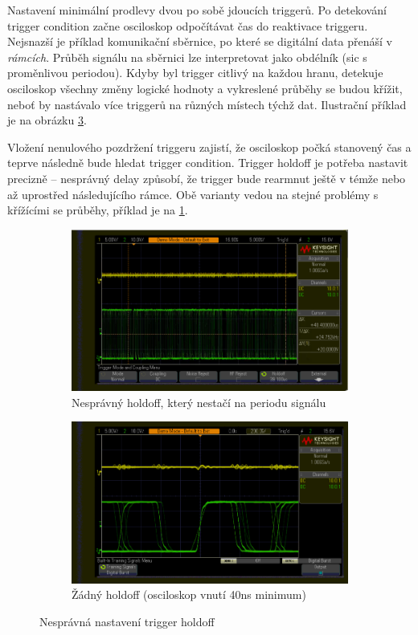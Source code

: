\documentclass[twoside]{article}
\begin{document}
Nastavení minimální prodlevy dvou po sobě jdoucích triggerů. Po detekování trigger condition začne osciloskop odpočítávat čas do reaktivace triggeru.
Nejsnazší je příklad komunikační sběrnice, po které se digitální data přenáší v \textit{rámcích}.
Průběh signálu na sběrnici lze interpretovat jako obdélník (sic s proměnlivou periodou). Kdyby byl trigger citlivý na každou hranu,
detekuje osciloskop všechny změny logické hodnoty a vykreslené průběhy se budou křížit, neboť by nastávalo více triggerů na různých místech týchž dat.
Ilustrační příklad je na obrázku \ref{fig:no_holdoff}.

Vložení nenulového pozdržení triggeru zajistí, že osciloskop počká stanovený čas a teprve následně bude hledat trigger condition.
Trigger holdoff je potřeba nastavit precizně -- nesprávný delay způsobí, že trigger bude rearmnut ještě v témže nebo až uprostřed
následujícího rámce. Obě varianty vedou na stejné problémy s křížícími se průběhy, příklad je na \ref{fig:bad_holdoff}.

\begin{figure}[htbp]
	\centering
	\begin{subfigure}{0.45\textwidth}
		\includegraphics[width=\linewidth]{digital_glitch_bad_holdoff.png                      }
		\caption{Nesprávný holdoff, který nestačí na periodu signálu}
		\label{fig:bad_holdoff}
	\end{subfigure}
	\begin{subfigure}{0.45\textwidth}
		\includegraphics[width=\linewidth]{digital_glitch_no_holdoff.png                    }
		\caption{Žádný holdoff (osciloskop vnutí 40ns minimum)}
		\label{fig:no_holdoff}
	\end{subfigure}
	\caption{Nesprávná nastavení trigger holdoff}
\end{figure}
\end{document}

